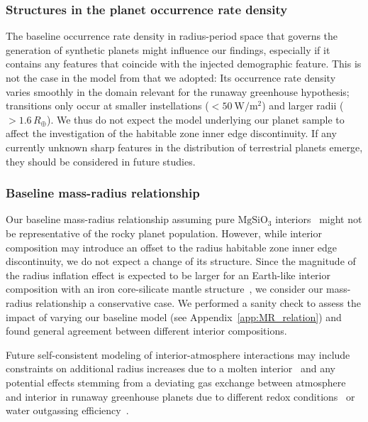 \documentclass[twocolumn,twocolappendix]{aastex631}
\begin{document}
\subsubsection{Structures in the planet occurrence rate density}
The baseline occurrence rate density in radius-period space that governs the generation of synthetic planets might influence our findings, especially if it contains any features that coincide with the injected demographic feature.
This is not the case in the model from \citet{Bergsten2022} that we adopted: Its occurrence rate density varies smoothly in the domain relevant for the runaway greenhouse hypothesis; transitions only occur at smaller instellations ($< \SI{50}{\watt\per\meter\squared}$) and larger radii ($> 1.6\,R_\oplus$).
We thus do not expect the model underlying our planet sample to affect the investigation of the habitable zone inner edge discontinuity.
If any currently unknown sharp features in the distribution of terrestrial planets emerge, they should be considered in future studies.

\subsubsection{Baseline mass-radius relationship}
Our baseline mass-radius relationship assuming pure $\mathrm{MgSiO_3}$ interiors~\citep{Zeng2016} might not be representative of the rocky planet population.
However, while interior composition may introduce an offset to the radius habitable zone inner edge discontinuity, we do not expect a change of its structure.
Since the magnitude of the radius inflation effect is expected to be larger for an Earth-like interior composition with an iron core-silicate mantle structure~\citep{Zeng2016,Noack2020,2021JGRE..12606724B}, we consider our mass-radius relationship a conservative case.
We performed a sanity check to assess the impact of varying our baseline model (see Appendix~\ref{app:MR_relation}) and found general agreement between different interior compositions.

Future self-consistent modeling of interior-atmosphere interactions may include constraints on additional radius increases due to a molten interior~\citep{Bower2019} and any potential effects stemming from a deviating gas exchange between atmosphere and interior in runaway greenhouse planets due to different redox conditions~\citep{Ikoma2018,Lichtenberg2021c,2022PSJ.....3...93B,2021SSRv..217...22G} or water outgassing efficiency~\citep[e.g.,][]{Hier-Majumder2017,Ikoma2018,Salvador2023}.
\end{document}
